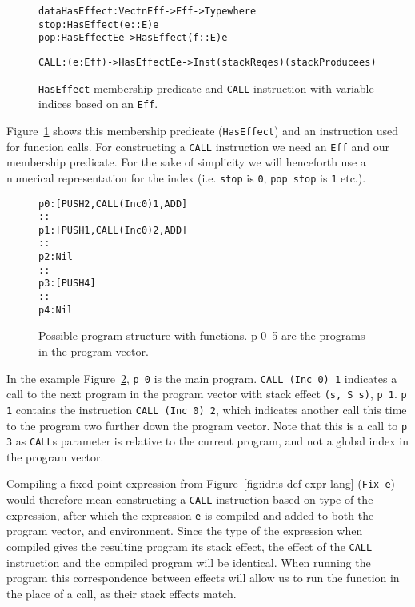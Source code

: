 \begin{figure}
\begin{alltt}
data HasEffect : Vect n Eff -> Eff -> Type where
    stop : HasEffect (e :: E) e
    pop  : HasEffect E e -> HasEffect (f :: E) e

CALL : (e : Eff) -> HasEffect E e -> Inst (stackReq e s) (stackProduce e s)
\end{alltt}
\caption{\texttt{HasEffect} membership predicate and \texttt{CALL} instruction with variable indices based on an \texttt{Eff}.}
\label{fig:call}
\end{figure}

Figure~\ref{fig:call} shows this membership predicate (\texttt{HasEffect}) and an instruction used for function calls. For constructing a \texttt{CALL} instruction we need an \texttt{Eff} and our membership predicate. For the sake of simplicity we will henceforth use a numerical representation for the index (i.e. \texttt{stop} is \texttt{0}, \texttt{pop stop} is \texttt{1} etc.).

\begin{figure}
\begin{alltt}
p 0: [PUSH 2, CALL (Inc 0) 1, ADD]
     ::
p 1: [PUSH 1, CALL (Inc 0) 2, ADD]
     ::
p 2: Nil
     ::
p 3: [PUSH 4]
     ::
p 4: Nil
\end{alltt}
\caption{Possible program structure with functions. p 0--5 are the programs in the program vector.}
\label{fig:program_structure}
\end{figure}

In the example Figure~\ref{fig:program_structure}, \texttt{p 0} is the main program. \texttt{CALL (Inc 0) 1} indicates a call to the next program in the program vector with stack effect \texttt{(s,~S~s)}, \texttt{p 1}. \texttt{p 1} contains the instruction \texttt{CALL (Inc 0) 2}, which indicates another call this time to the program two further down the program vector. Note that this is a call to \texttt{p 3} as \texttt{CALL}s parameter is relative to the current program, and not a global index in the program vector. 

Compiling a fixed point expression from Figure~\ref{fig:idris-def-expr-lang} (\texttt{Fix e}) would therefore mean constructing a \texttt{CALL} instruction based on type of the expression, after which the expression \texttt{e} is compiled and added to both the program vector, and environment. Since the type of the expression when compiled gives the resulting program its stack effect, the effect of the \texttt{CALL} instruction and the compiled program will be identical. When running the program this correspondence between effects will allow us to run the function in the place of a call, as their stack effects match.

